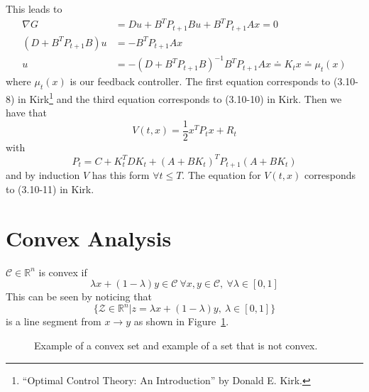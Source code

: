 This leads to
\begin{align*}
\nabla G &= Du + B^T P_{t+1}Bu + B^T P_{t+1}Ax = 0 \\
(D+B^T P_{t+1}B)u &= -B^T P_{t+1}Ax \\
u &= -{(D+B^T P_{t+1}B)}^{-1}B^T P_{t+1}Ax \doteq K_t x \doteq \mu_t(x)
\end{align*}
where $\mu_t(x)$ is our feedback controller.
The first equation corresponds to (3.10-8) in Kirk\footnote{``Optimal Control Theory: An Introduction'' by Donald E. Kirk.} and the third equation corresponds to (3.10-10) in Kirk.%
Then we have that
$$V(t,x) = \frac{1}{2}x^T P_t x + R_t$$
with
$$P_t = C+ K_t^T DK_t + {(A+BK_t)}^T P_{t+1} (A+BK_t)$$
and by induction $V$ has this form $\forall t\leq T$.
The equation for $V(t,x)$ corresponds to (3.10-11) in Kirk.%

\section{Convex Analysis}
\begin{definition}
$\mathcal{C}\in\mathbb{R}^n$ is convex if
$$\lambda x + (1-\lambda)y \in \mathcal{C}~\forall x,y\in\mathcal{C},~\forall \lambda\in[0,1]$$
This can be seen by noticing that
$$\{\mathcal{Z}\in\mathbb{R}^n | z=\lambda x+(1-\lambda)y,~\lambda\in[0,1]\}$$
is a line segment from $x\to y$ as shown in Figure~\ref{fig:05convex}.
\end{definition}

\begin{figure}[ht!]
\centering
{} \hfill
{}
\caption{\protect{} Example of a convex set and \protect{} example of a set that is not convex.}
\label{fig:05convex}
\end{figure}

